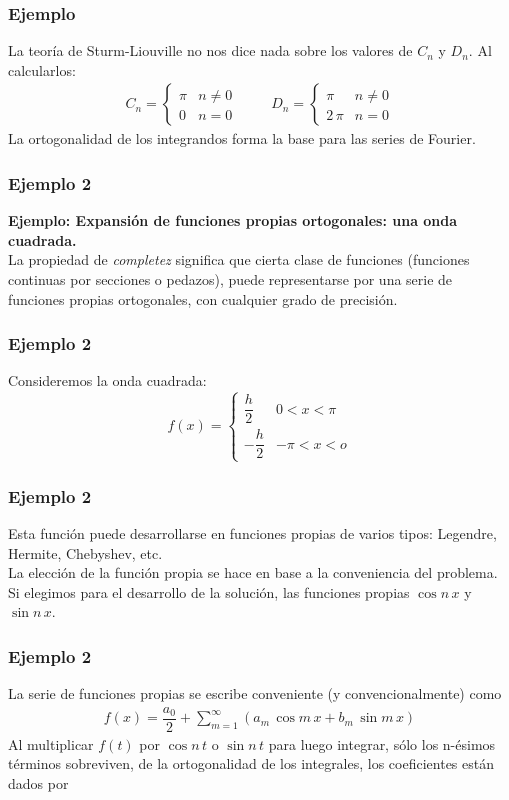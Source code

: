 \begin{frame}
\frametitle{Ejemplo}
La teoría de Sturm-Liouville no nos dice nada sobre los valores de $C_{n}$ y $D_{n}$. Al calcularlos:
\begin{align*}
C_{n} = \begin{cases}
\pi  & n \neq 0 \\
0  & n = 0 \end{cases}
\hspace{1cm}
D_{n} = \begin{cases}
\pi & n \neq 0 \\
2 \, \pi & n = 0 \end{cases}
\end{align*}
La ortogonalidad de los integrandos forma la base para las series de Fourier.
\end{frame}
\begin{frame}
\frametitle{Ejemplo 2}
\textbf{Ejemplo: Expansión de funciones propias ortogonales: una onda cuadrada.}
\\
\bigskip
\pause
La propiedad de \emph{completez} significa que cierta clase de funciones (funciones continuas por secciones o pedazos), puede representarse por una serie de funciones propias ortogonales, con cualquier grado de precisión.
\end{frame}
\begin{frame}
\frametitle{Ejemplo 2}
Consideremos la onda cuadrada:
\begin{equation}
f(x) = \begin{cases}
\dfrac{h}{2} & 0 < x < \pi \\[0.5em]
- \dfrac{h}{2} & -\pi < x < o
\end{cases}
\label{eq_ecuacion_10_37}
\end{equation}
\end{frame}
\begin{frame}
\frametitle{Ejemplo 2}
Esta función puede desarrollarse en funciones propias de varios tipos: Legendre, Hermite, Chebyshev, etc.
\\
\bigskip
\pause
La elección de la función propia se hace en base a la conveniencia del problema. Si elegimos para el desarrollo de la solución, las funciones propias $\cos n \, x$ y $\sin n \, x$.
\end{frame}
\begin{frame}
\frametitle{Ejemplo 2}
La serie de funciones propias se escribe conveniente (y convencionalmente) como
\begin{align*}
f(x) = \dfrac{a_{0}}{2} + \sum_{m=1}^{\infty} (a_{m} \, \cos m \, x +  b_{m} \, \sin m \, x)
\end{align*}
\pause
Al multiplicar $f(t)$ por $\cos n \, t$ o $\sin n \, t$ para luego integrar, sólo los n-ésimos términos sobreviven, de la ortogonalidad de los integrales, los coeficientes están dados por
\end{frame}

